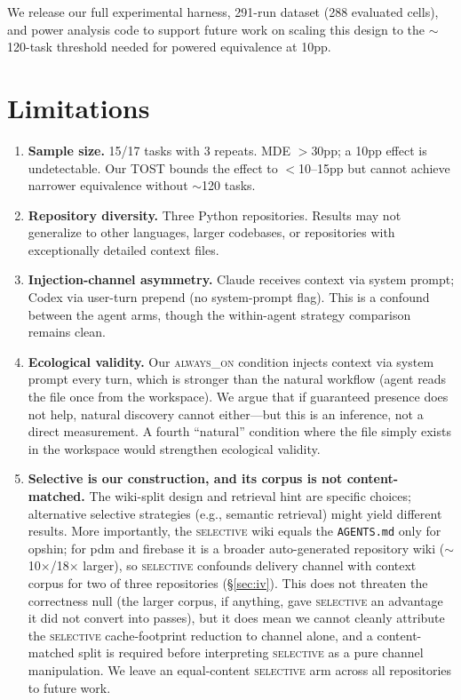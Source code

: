 \documentclass[11pt]{article}
\newcommand{\agentsmd}{\texttt{AGENTS.md}}
\newcommand{\alwayson}{\textsc{always\_on}}
\newcommand{\selective}{\textsc{selective}}
\begin{document}
We release our full experimental harness, 291-run dataset (288 evaluated cells), and power analysis code to support future work on scaling this design to the ${\sim}$120-task threshold needed for powered equivalence at 10pp.

\section*{Limitations}
\label{sec:limitations}

\begin{enumerate}
    \item \textbf{Sample size.} 15/17 tasks with 3 repeats. MDE $>$30pp; a 10pp effect is undetectable. Our TOST bounds the effect to $<$10--15pp but cannot achieve narrower equivalence without $\sim$120 tasks.
    \item \textbf{Repository diversity.} Three Python repositories. Results may not generalize to other languages, larger codebases, or repositories with exceptionally detailed context files.
    \item \textbf{Injection-channel asymmetry.} Claude receives context via system prompt; Codex via user-turn prepend (no system-prompt flag). This is a confound between the agent arms, though the within-agent strategy comparison remains clean.
    \item \textbf{Ecological validity.} Our \alwayson{} condition injects context via system prompt every turn, which is stronger than the natural workflow (agent reads the file once from the workspace). We argue that if guaranteed presence does not help, natural discovery cannot either---but this is an inference, not a direct measurement. A fourth ``natural'' condition where the file simply exists in the workspace would strengthen ecological validity.
    \item \textbf{Selective is our construction, and its corpus is not content-matched.} The wiki-split design and retrieval hint are specific choices; alternative selective strategies (e.g., semantic retrieval) might yield different results. More importantly, the \selective{} wiki equals the \agentsmd{} only for opshin; for pdm and firebase it is a broader auto-generated repository wiki ($\sim$10$\times$/18$\times$ larger), so \selective{} confounds delivery channel with context corpus for two of three repositories (\S\ref{sec:iv}). This does not threaten the correctness null (the larger corpus, if anything, gave \selective{} an advantage it did not convert into passes), but it does mean we cannot cleanly attribute the \selective{} cache-footprint reduction to channel alone, and a content-matched split is required before interpreting \selective{} as a pure channel manipulation. We leave an equal-content \selective{} arm across all repositories to future work.

\end{enumerate}
\end{document}
